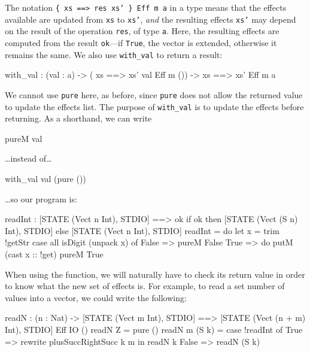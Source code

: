 \noindent
The notation \texttt{\{ xs ==> {res} xs' \} Eff m a} in a type means that the
effects available are updated from \texttt{xs} to \texttt{xs'}, \emph{and}
the resulting effects \texttt{xs'} may depend on the result of the operation
\texttt{res}, of type \texttt{a}. Here, the resulting effects are computed
from the result \texttt{ok}---if \texttt{True}, the vector is extended, otherwise
it remains the same. We also use \texttt{with\_val} to return a result:

\begin{code}
with_val : (val : a) -> 
           ({ xs ==> xs' val } Eff m ()) -> { xs ==> xs' } Eff m a
\end{code}

\noindent
We cannot use \texttt{pure} here, as before, since \texttt{pure} does not allow
the returned value to update the effects list. The purpose of \texttt{with\_val}
is to update the effects before returning. As a shorthand, we can write

\begin{code}
pureM val
\end{code}

\ldots instead of\ldots

\begin{code}
with_val val (pure ())
\end{code}

\noindent
\ldots so our program is:

\begin{code}
readInt : { [STATE (Vect n Int), STDIO] ==>
            {ok} if ok then [STATE (Vect (S n) Int), STDIO]
                       else [STATE (Vect n Int), STDIO] }
readInt = do let x = trim !getStr
             case all isDigit (unpack x) of
                  False => pureM False
                  True => do putM (cast x :: !get)
                             pureM True
\end{code}

\noindent
When using the function, we will naturally have to check its return value
in order to know what the new set of effects is. For example, to read a set
number of values into a vector, we could write the following:

\begin{code}
readN : (n : Nat) ->
        { [STATE (Vect m Int), STDIO] ==>
          [STATE (Vect (n + m) Int), STDIO] } Eff IO ()
readN Z = pure ()
readN {m} (S k) = case !readInt of
                      True => rewrite plusSuccRightSucc k m in readN k
                      False => readN (S k)
\end{code}

